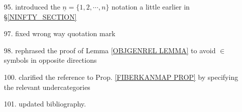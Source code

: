 \documentclass{article}
\begin{document}
\begin{itemize}
\item[95.] introduced the 
$\underline{n} = \{1,2,\cdots,n\}$
notation a little earlier in \S \ref{NINFTY_SECTION}

\item[97.] fixed wrong way quotation mark

\item[98.] rephrased the proof of Lemma \ref{OBJGENREL LEMMA}
to avoid $\in$ symbols in opposite directions

\item[100.] clarified the reference to Prop. \ref{FIBERKANMAP PROP} by specifying the relevant undercategories

\item[101.] updated bibliography.

\end{itemize}








{}


\end{document}

